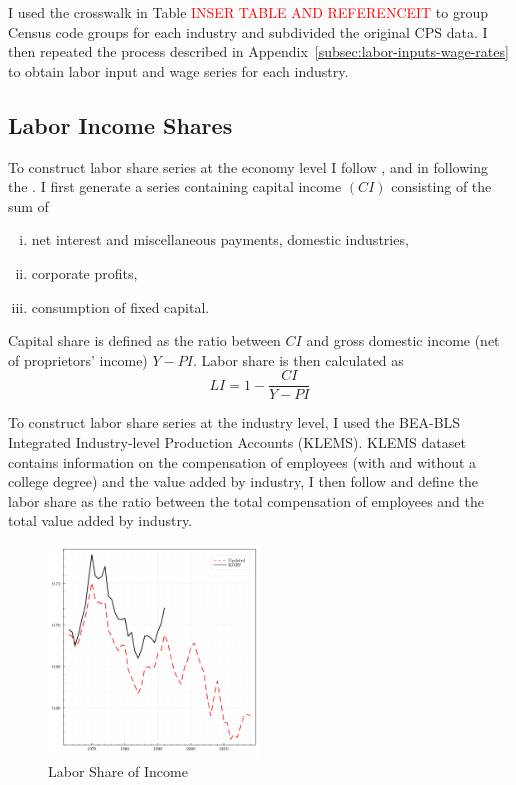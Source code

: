 \documentclass[12pt]{article}
\begin{document}
I used the crosswalk in Table \textcolor{red}{INSER TABLE AND REFERENCEIT} to group Census code groups for each industry and subdivided the original CPS data. I then repeated the process described in Appendix~\ref{subsec:labor-inputs-wage-rates} to obtain labor input and wage series for each industry.


\subsection{Labor Income Shares}\label{sec:labor_share_income}
To construct labor share series at the economy level I follow \citet{krusell2000capital}, \citet{castex2022decline} and \citet{ohanian2021revisiting} in following the \citet*{cooley1995frontiers}. I first generate a series containing capital income $(CI)$ consisting of the sum of 
\begin{enumerate}[(i)]
 \item net interest and miscellaneous payments, domestic industries,
 \item corporate profits,
 \item consumption of fixed capital.
\end{enumerate}
Capital share is defined as the ratio between $CI$ and gross domestic income (net of proprietors' income) $Y - PI$. Labor share is then calculated as 
\begin{equation*}
 LI = 1 - \frac{CI}{Y - PI}
\end{equation*}

To construct labor share series at the industry level, I used the BEA-BLS Integrated Industry-level Production Accounts (KLEMS). KLEMS dataset contains information on the compensation of employees (with and without a college degree) and the value added by industry, I then follow \citep{karabarbounis2014global} and define the labor share as the ratio between the total compensation of employees and the total value added by industry.

\begin{figure}%
\centering
\includegraphics[width=0.5\textwidth]{../images/fig:labor_share_updated.pdf}
\caption{\label{fig:labor_share_updated} Labor Share of Income}
\end{figure}
\end{document}
